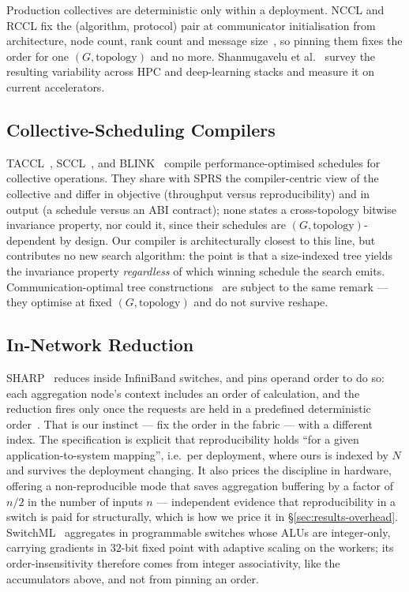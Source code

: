 \documentclass[journal,10pt]{IEEEtran}
\theoremstyle{plain}
\theoremstyle{definition}
\theoremstyle{remark}
\newcommand{\sprs}{\textsc{SPRS}}
\begin{document}
Production collectives are deterministic only within a deployment. NCCL and
RCCL fix the (algorithm, protocol) pair at communicator initialisation from
architecture, node count, rank count and message
size~\cite{nccl2018,rccl2019}, so pinning them fixes the order for one
$(G,\text{topology})$ and no more. Shanmugavelu et
al.~\cite{shanmugavelu2024} survey the resulting variability across HPC and
deep-learning stacks and measure it on current accelerators.

\subsection{Collective-Scheduling Compilers}

TACCL~\cite{shah2023taccl}, SCCL~\cite{cai2021synthesizing}, and
BLINK~\cite{wang2020blink} compile performance-optimised schedules for
collective operations. They share with \sprs{} the compiler-centric view of
the collective and differ in objective (throughput versus reproducibility)
and in output (a schedule versus an ABI contract); none states a
cross-topology bitwise invariance property, nor could it, since their
schedules are $(G,\text{topology})$-dependent by design. Our compiler is
architecturally closest to this line, but contributes no new search
algorithm: the point is that a size-indexed tree yields the invariance
property \emph{regardless} of which winning schedule the search emits.
Communication-optimal tree
constructions~\cite{huffman1952,jeannot2014treematch} are subject to the
same remark --- they optimise at fixed $(G,\text{topology})$ and do not
survive reshape.

\subsection{In-Network Reduction}

SHARP~\cite{graham2016scalable} reduces inside InfiniBand switches, and pins
operand order to do so: each aggregation node's context includes an order of
calculation, and the reduction fires only once the requests are held in a
predefined deterministic order~\cite{mellanox2019aggregation}. That is our
instinct --- fix the order in the fabric --- with a different index. The
specification is explicit that reproducibility holds ``for a given
application-to-system mapping'', i.e.\ per deployment, where ours is indexed
by $N$ and survives the deployment changing. It also prices the discipline
in hardware, offering a non-reproducible mode that saves aggregation
buffering by a factor of $n/2$ in the number of inputs $n$ --- independent
evidence that reproducibility in a switch is paid for structurally, which is
how we price it in \S\ref{sec:results-overhead}.
SwitchML~\cite{sapio2021scaling} aggregates in programmable switches whose
ALUs are integer-only, carrying gradients in $32$-bit fixed point with
adaptive scaling on the workers; its order-insensitivity therefore comes
from integer associativity, like the accumulators above, and not from
pinning an order.
\end{document}
